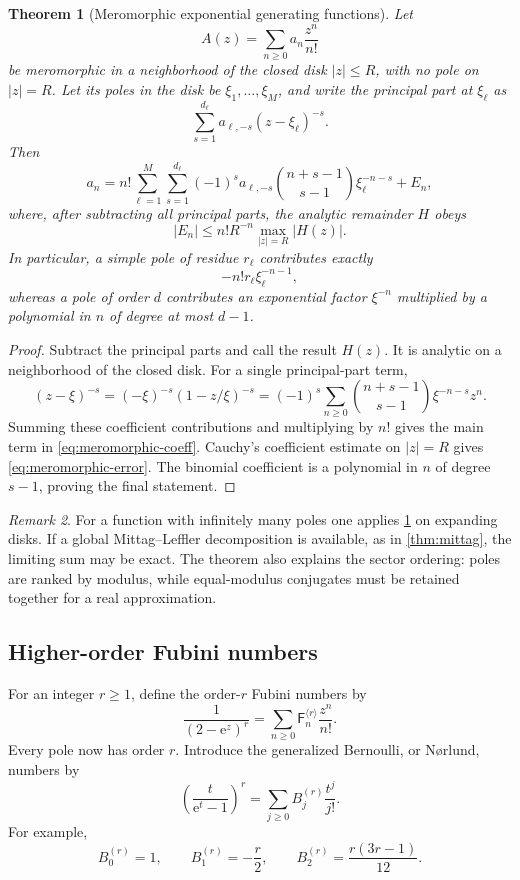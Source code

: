 \documentclass[11pt,a4paper,oneside]{article}
\newtheorem{theorem}{Theorem}[section]
\theoremstyle{definition}
\theoremstyle{remark}
\newtheorem{remark}[theorem]{Remark}
\newcommand{\Fub}{\mathsf{F}}
\newcommand{\e}{\mathrm{e}}
\begin{document}
\begin{theorem}[Meromorphic exponential generating functions]
\label{thm:meromorphic-egf}
Let
\[
 A(z)=\sum_{n\ge0}a_n\frac{z^n}{n!}
\]
be meromorphic in a neighborhood of the closed disk $|z|\le R$, with no pole
on $|z|=R$.  Let its poles in the disk be $\xi_1,\ldots,\xi_M$, and write the
principal part at $\xi_\ell$ as
\[
 \sum_{s=1}^{d_\ell}a_{\ell,-s}(z-\xi_\ell)^{-s}.
\]
Then
\begin{equation}\label{eq:meromorphic-coeff}
 a_n=n!\sum_{\ell=1}^{M}\sum_{s=1}^{d_\ell}
 (-1)^s a_{\ell,-s}
 \binom{n+s-1}{s-1}\xi_\ell^{-n-s}+E_n,
\end{equation}
where, after subtracting all principal parts, the analytic remainder $H$ obeys
\begin{equation}\label{eq:meromorphic-error}
 |E_n|\le n!R^{-n}\max_{|z|=R}|H(z)|.
\end{equation}
In particular, a simple pole of residue $r_\ell$ contributes exactly
\[
 -n!r_\ell\xi_\ell^{-n-1},
\]
whereas a pole of order $d$ contributes an exponential factor
$\xi^{-n}$ multiplied by a polynomial in $n$ of degree at most $d-1$.
\end{theorem}

\begin{proof}
Subtract the principal parts and call the result $H(z)$.  It is analytic on a
neighborhood of the closed disk.  For a single principal-part term,
\[
 (z-\xi)^{-s}
 =(-\xi)^{-s}(1-z/\xi)^{-s}
 =(-1)^s\sum_{n\ge0}
   \binom{n+s-1}{s-1}\xi^{-n-s}z^n.
\]
Summing these coefficient contributions and multiplying by $n!$ gives the
main term in \cref{eq:meromorphic-coeff}.  Cauchy's coefficient estimate on
$|z|=R$ gives \cref{eq:meromorphic-error}.  The binomial coefficient is a
polynomial in $n$ of degree $s-1$, proving the final statement.
\end{proof}

\begin{remark}
For a function with infinitely many poles one applies
\cref{thm:meromorphic-egf} on expanding disks.  If a global Mittag--Leffler
decomposition is available, as in \cref{thm:mittag}, the limiting sum may be
exact.  The theorem also explains the sector ordering: poles are ranked by
modulus, while equal-modulus conjugates must be retained together for a real
approximation.
\end{remark}

\subsection{Higher-order Fubini numbers}
For an integer $r\ge1$, define the order-$r$ Fubini numbers by
\begin{equation}\label{eq:higher-fubini-def}
 \frac{1}{(2-\e^z)^r}
 =\sum_{n\ge0}\Fub_n^{\langle r\rangle}\frac{z^n}{n!}.
\end{equation}
Every pole now has order $r$.  Introduce the generalized Bernoulli, or
N\o rlund, numbers by
\begin{equation}\label{eq:norlund-def}
 \left(\frac{t}{\e^t-1}\right)^r
 =\sum_{j\ge0}B_j^{(r)}\frac{t^j}{j!}.
\end{equation}
For example,
\[
 B_0^{(r)}=1,
 \qquad B_1^{(r)}=-\frac r2,
 \qquad B_2^{(r)}=\frac{r(3r-1)}{12}.
\]
\end{document}
